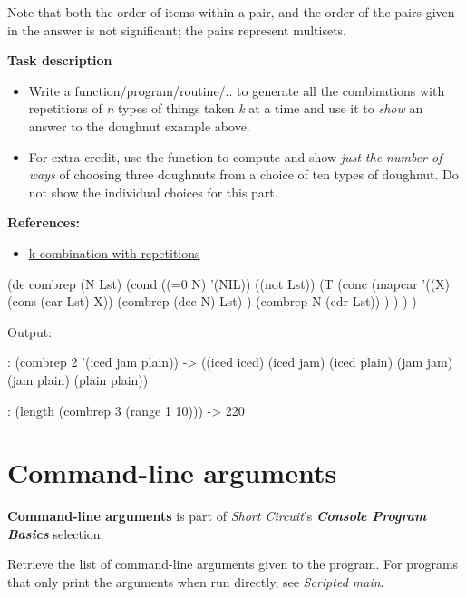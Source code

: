 Note that both the order of items within a pair, and the order of the
pairs given in the answer is not significant; the pairs represent
multisets.

\textbf{Task description}

\begin{itemize}
\item
  Write a function/program/routine/.. to generate all the combinations
  with repetitions of \emph{n} types of things taken \emph{k} at a time
  and use it to \emph{show} an answer to the doughnut example above.
\item
  For extra credit, use the function to compute and show \emph{just the
  number of ways} of choosing three doughnuts from a choice of ten types
  of doughnut. Do not show the individual choices for this part.
\end{itemize}

\textbf{References:}

\begin{itemize}
\item
  \href{http://en.wikipedia.org/wiki/Combination}{k-combination with
  repetitions}
\end{itemize}


\begin{wideverbatim}

(de combrep (N Lst)
   (cond
      ((=0 N) '(NIL))
      ((not Lst))
      (T
         (conc
            (mapcar
               '((X) (cons (car Lst) X))
               (combrep (dec N) Lst) )
            (combrep N (cdr Lst)) ) ) ) )

Output:

: (combrep 2 '(iced jam plain))
-> ((iced iced) (iced jam) (iced plain) (jam jam) (jam plain) (plain plain))

: (length (combrep 3 (range 1 10)))
-> 220

\end{wideverbatim}

\pagebreak{}
\section*{Command-line arguments}


\textbf{Command-line arguments} is part of \emph{Short Circuit}'s
\textbf{\emph{Console Program Basics}} selection.

Retrieve the list of command-line arguments given to the program. For
programs that only print the arguments when run directly, see
\emph{Scripted main}.

